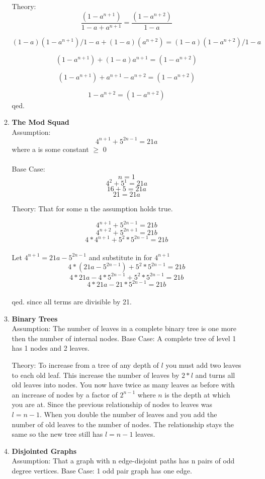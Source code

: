 \documentclass[12pt]{amsart}
\newcommand{\fr}[2]{\frac{#1}{#2}}
\begin{document}
\begin{enumerate}
\begin{enumerate}
        Theory:    $$\fr{(1 - a^{n+1})}{1-a + a^{n+1}} = \fr{(1 - a^{n+2})}{1 -
        a}$$

                   $$(1 - a)(1 - a^{n+1})/1-a + (1 -a)(a^{n+2}) = (1 - a)(1 - a^{n+2})/1 -
                   a$$

                   $$(1 - a^{n+1}) + (1 - a)a^{n+1} = (1 -
                   a^{n+2})$$

           $$(1 - a^{n+1}) + a^{n+1} - a^{n+2} = (1 - a^{n+2})$$

           $$1- a^{n+2} = (1 - a^{n+2})$$
qed.
\\


\item {\bf The Mod Squad}
\\

    Assumption: $$4^{n+1} + 5^{2n-1} = 21a $$ where a is some constant
    $\geq $  0\\
  \\  Base Case:  $$n = 1$$
     $$4^{2} + 5^{1} = 21a$$
                     $$ 16 + 5 = 21a$$
                     $$ 21 = 21a$$

        Theory:     That for some n the assumption holds true.

                   $$ 4^{n+1} + 5^{2n-1} = 21b$$
                    $$4^{n+2} + 5^{2n+1} = 21b$$
                   $$ 4*4^{n+1} + 5^2 * 5^{2n-1} = 21b$$
                    \\    Let $4^{n+1} = 21a - 5^{2n-1}$ and substitute in
                       for
                        $4^{n+1}$\\
                   $$ 4*(21a - 5^{2n-1}) + 5^2 * 5^{2n-1} = 21b$$
                   $$ 4*21a - 4*5^{2n-1} + 5^2 * 5^{2n-1} = 21b$$
                   $$ 4*21a - 21* 5^{2n-1} = 21b$$
\\
        qed. since all terms are divisible by 21.



\item{\bf Binary Trees}
\\
       Assumption: The number of leaves in a complete binary tree is one more then the number of internal nodes.
       Base Case:  A complete tree of level 1 has 1 nodes and 2 leaves.

       Theory:  To increase from a tree of any depth of $l$ you must add two leaves to each old leaf.  This increase the
number of leaves by $2*l$ and turns all old leaves into nodes. You
now have twice as many leaves as before with an increase of nodes
by a factor of $2^{n-1}$ where $n$ is the depth at which you are
at. Since the previous relationship of nodes to leaves was $l = n
- 1.$ When you double the number of leaves and you add the number
of old leaves to the number of nodes.  The relationship stays the
same so the new tree still has $l = n - 1$ leaves.
\\
\item{\bf Disjointed Graphs}\\
    Assumption: That a graph with n edge-disjoint paths has n pairs of odd degree
vertices.
    Base Case: 1 odd pair graph has one edge.


\end{enumerate}
\end{enumerate}
\end{document}
